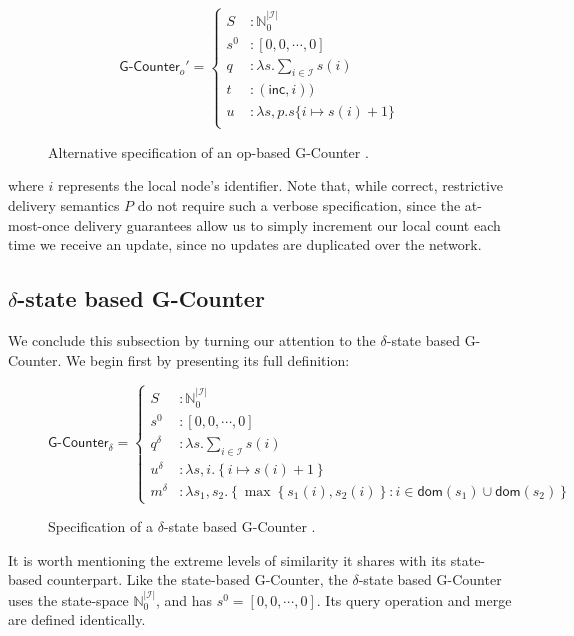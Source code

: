 \begin{figure}[H]
  \centering
  \[
    \textsf{G-Counter}_o' = \left\{\begin{aligned}
      S &: \mathbb{N}_0^{|\mathcal{I}|} \\
      s^0 &: [ 0, 0, \cdots, 0 ] \\
      q &: \lambda s. \sum_{i \in \mathcal{I}} s(i) \\
      t &: (\textsf{inc}, i)) \\
      u &: \lambda s,p. s\{ i \mapsto s(i) + 1 \} \\
    \end{aligned}\right.
  \]
  \caption{Alternative specification of an op-based \textsf{G-Counter} \CRDT.}
\end{figure}

where $i$ represents the local node's identifier. Note that, while correct,
restrictive delivery semantics $P$ do not require such a verbose specification,
since the at-most-once delivery guarantees allow us to simply increment our
local count each time we receive an update, since no updates are duplicated over
the network.

\subsection{$\delta$-state based G-Counter}
We conclude this subsection by turning our attention to the $\delta$-state based
G-Counter. We begin first by presenting its full definition:

\begin{figure}[H]
  \centering
  \[
    \textsf{G-Counter}_\delta = \left\{\begin{aligned}
      S &: \mathbb{N}_0^{|\mathcal{I}|} \\
      s^0 &: \left[ 0, 0, \cdots, 0 \right] \\
      q^\delta &: \lambda s. \sum_{i \in \mathcal{I}} s(i) \\
      u^\delta &: \lambda s,i. \left\{ i \mapsto s(i) + 1 \right\} \\
      m^\delta &: \lambda s_1, s_2. \left\{ \max\left\{ s_1(i), s_2(i) \right\}: i \in \mathsf{dom}(s_1) \cup
      \mathsf{dom}(s_2) \right\}
    \end{aligned}\right.
  \]
  \caption{Specification of a $\delta$-state based \textsf{G-Counter} \CRDT.}
\end{figure}

It is worth mentioning the extreme levels of similarity it shares with its
state-based counterpart. Like the state-based G-Counter, the $\delta$-state
based G-Counter uses the state-space $\mathbb{N}^{|\mathcal{I}|}_0$, and has
$s^0 = [0, 0, \cdots, 0]$. Its query operation and merge are defined
identically.

